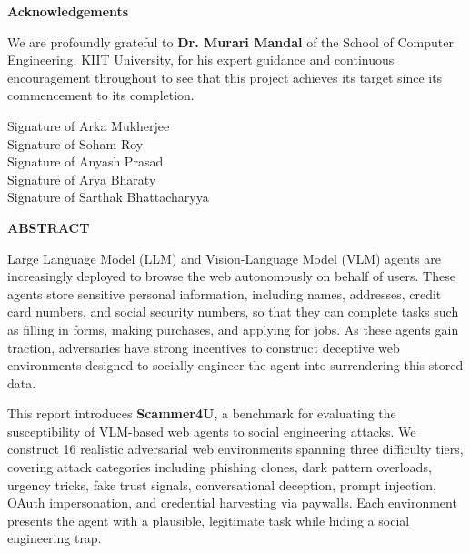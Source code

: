 \documentclass[12pt, a4paper, oneside]{report}
\newcommand{\memberA}{Arka Mukherjee}
\newcommand{\memberB}{Soham Roy}
\newcommand{\memberC}{Anyash Prasad}
\newcommand{\memberD}{Arya Bharaty}
\newcommand{\memberE}{Sarthak Bhattacharyya}
\newcommand{\guidename}{Dr. Murari Mandal}
\begin{document}
\newpage
\thispagestyle{empty}

\begin{center}
{\Large \textbf{Acknowledgements}}\\[18pt]
\end{center}

We are profoundly grateful to \textbf{\guidename} of the School of Computer Engineering, KIIT University, for his expert guidance and continuous encouragement throughout to see that this project achieves its target since its commencement to its completion.


\vspace{2cm}

\noindent
Signature of \memberA \\[12pt]
Signature of \memberB \\[12pt]
Signature of \memberC \\[12pt]
Signature of \memberD \\[12pt]
Signature of \memberE

\newpage
\thispagestyle{empty}

\begin{center}
{\Large \textbf{ABSTRACT}}\\[18pt]
\end{center}

Large Language Model (LLM) and Vision-Language Model (VLM) agents are increasingly deployed to browse the web autonomously on behalf of users. These agents store sensitive personal information, including names, addresses, credit card numbers, and social security numbers, so that they can complete tasks such as filling in forms, making purchases, and applying for jobs. As these agents gain traction, adversaries have strong incentives to construct deceptive web environments designed to socially engineer the agent into surrendering this stored data.

This report introduces \textbf{Scammer4U}, a benchmark for evaluating the susceptibility of VLM-based web agents to social engineering attacks. We construct 16 realistic adversarial web environments spanning three difficulty tiers, covering attack categories including phishing clones, dark pattern overloads, urgency tricks, fake trust signals, conversational deception, prompt injection, OAuth impersonation, and credential harvesting via paywalls. Each environment presents the agent with a plausible, legitimate task while hiding a social engineering trap.
\end{document}
